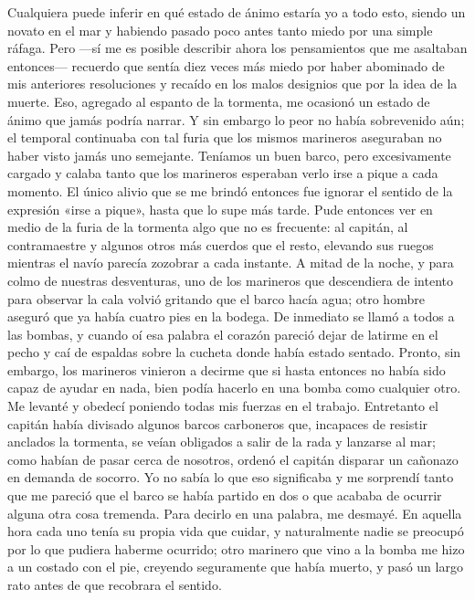 \documentclass{novela}
\begin{document}
    Cualquiera puede inferir en qué estado de ánimo estaría yo a todo esto, siendo un novato en el mar y habiendo pasado poco antes tanto miedo por una simple ráfaga. Pero —sí me es posible describir ahora los pensamientos que me asaltaban entonces— recuerdo que sentía diez veces más miedo por haber abominado de mis anteriores resoluciones y recaído en los malos designios que por la idea de la muerte. Eso, agregado al espanto de la tormenta, me ocasionó un estado de ánimo que jamás podría narrar. Y sin embargo lo peor no había sobrevenido aún; el temporal continuaba con tal furia que los mismos marineros aseguraban no haber visto jamás uno semejante. Teníamos un buen barco, pero excesivamente cargado y calaba tanto que los marineros esperaban verlo irse a pique a cada momento. El único alivio que se me brindó entonces fue ignorar el sentido de la expresión «irse a pique», hasta que lo supe más tarde. Pude entonces ver en medio de la furia de la tormenta algo que no es frecuente: al capitán, al contramaestre y algunos otros más cuerdos que el resto, elevando sus ruegos mientras el navío parecía zozobrar a cada instante. A mitad de la noche, y para colmo de nuestras desventuras, uno de los marineros que descendiera de intento para observar la cala volvió gritando que el barco hacía agua; otro hombre aseguró que ya había cuatro pies en la bodega. De inmediato se llamó a todos a las bombas, y cuando oí esa palabra el corazón pareció dejar de latirme en el pecho y caí de espaldas sobre la cucheta donde había estado sentado. Pronto, sin embargo, los marineros vinieron a decirme que si hasta entonces no había sido capaz de ayudar en nada, bien podía hacerlo en una bomba como cualquier otro. Me levanté y obedecí poniendo todas mis fuerzas en el trabajo. Entretanto el capitán había divisado algunos barcos carboneros que, incapaces de resistir anclados la tormenta, se veían obligados a salir de la rada y lanzarse al mar; como habían de pasar cerca de nosotros, ordenó el capitán disparar un cañonazo en demanda de socorro. Yo no sabía lo que eso significaba y me sorprendí tanto que me pareció que el barco se había partido en dos o que acababa de ocurrir alguna otra cosa tremenda. Para decirlo en una palabra, me desmayé. En aquella hora cada uno tenía su propia vida que cuidar, y naturalmente nadie se preocupó por lo que pudiera haberme ocurrido; otro marinero que vino a la bomba me hizo a un costado con el pie, creyendo seguramente que había muerto, y pasó un largo rato antes de que recobrara el sentido.
\end{document}
